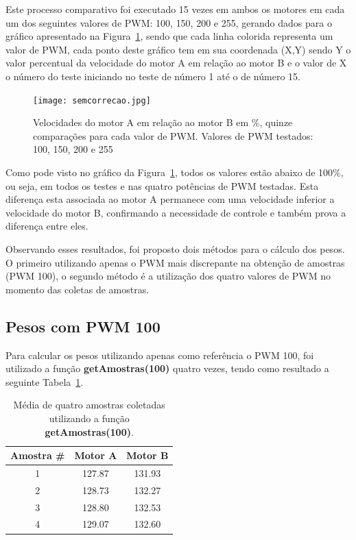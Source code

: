 \documentclass[a4paper,12pt,portuguese]{ufms-cpcx}
\begin{document}
Este processo comparativo foi executado 15 vezes em ambos os motores em cada um dos seguintes valores de PWM: 100, 150, 200 e 255, gerando dados para o gráfico apresentado na Figura~\ref{fig:semcorrecao}, sendo que cada linha colorida representa um valor de PWM, cada ponto deste gráfico tem em sua coordenada (X,Y) sendo Y o valor percentual da velocidade do motor A em relação ao motor B e o valor de X o número do teste iniciando no teste de número 1 até o de número 15.

\begin{figure}[H]	
	\centering
	\texttt{[image: semcorrecao.jpg]}
	\caption{Velocidades do motor A em relação ao motor B em \%, quinze comparações para cada valor de PWM. Valores de PWM testados: 100, 150, 200 e 255}
	\label{fig:semcorrecao}
\end{figure}

Como pode visto no gráfico da Figura~\ref{fig:semcorrecao}, todos os valores estão abaixo de 100\%, ou seja, em todos os testes e nas quatro potências de PWM testadas. Esta diferença esta associada ao motor A permanece com uma velocidade inferior a velocidade do motor B, confirmando a necessidade de controle e também prova a diferença entre eles.

Observando esses resultados, foi proposto dois métodos para o cálculo dos pesos. O primeiro utilizando apenas o PWM mais discrepante na obtenção de amostras (PWM 100), o segundo método é a utilização dos quatro valores de PWM no momento das coletas de amostras.

\subsection{Pesos com PWM 100} \label{calib100}
Para calcular os pesos utilizando apenas como referência o PWM 100, foi utilizado a função \textbf{getAmostras(100)} quatro vezes, tendo como resultado a seguinte Tabela~\ref{Tab:calib100}.

\begin{table}[!h]
	\renewcommand{\arraystretch}{1.3}
	\centering
	\begin{tabular}{|c|cc|}
		\hline
		Amostra \# & Motor A & Motor B \\ \hline
		    1      & 127.87  & 131.93  \\
		    2      & 128.73  & 132.27  \\
		    3      & 128.80  & 132.53  \\
		    4      & 129.07  & 132.60  \\ \hline
	\end{tabular}
	\caption[Tabela de amostras PWM 100]{\small Média de quatro amostras coletadas utilizando a função \textbf{getAmostras(100)}.}
	\label{Tab:calib100}
\end{table}
\end{document}

